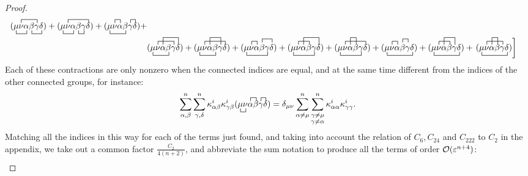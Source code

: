 \documentclass[letterpaper, reqno, 11pt]{amsart}
\theoremstyle{definition}
\theoremstyle{remark}
\numberwithin{equation}{section}
\begin{document}
\begin{proof}
\begin{align*}
\bcontraction{(}{\mu}{\nu}{\al}\contraction{(\mu}{\nu}{\al\bet}{\ga}\bcontraction{(\mu\nu\al}{\bet}{\ga}{\del}(\mu\nu\al\bet\ga\del) +
\bcontraction{(}{\mu}{\nu}{\al}\contraction{(\mu}{\nu}{\al\bet\ga}{\del}\bcontraction{(\mu\nu\al}{\bet}{}{\ga}(\mu\nu\al\bet\ga\del) +
\bcontraction{(}{\mu}{\nu\al}{\bet}\contraction{(\mu}{\nu}{}{\al}\contraction{(\mu\nu\al\bet}{\ga}{}{\del}(\mu\nu\al\bet\ga\del) + \\
& 
\bcontraction{(}{\mu}{\nu\al}{\bet}\contraction{(\mu}{\nu}{\al\bet}{\ga}\contraction[2ex]{(\mu\nu}{\al}{\bet\ga}{\del}(\mu\nu\al\bet\ga\del) +
\bcontraction{(}{\mu}{\nu\al}{\bet}\contraction{(\mu}{\nu}{\al\bet\ga}{\del}\contraction[2ex]{(\mu\nu}{\al}{\bet}{\ga}(\mu\nu\al\bet\ga\del) +
\bcontraction{(}{\mu}{\nu\al\bet}{\ga}\contraction{(\mu}{\nu}{}{\al}\contraction{(\mu\nu\al}{\bet}{\ga}{\del}(\mu\nu\al\bet\ga\del) +
\bcontraction{(}{\mu}{\nu\al\bet}{\ga}\contraction{(\mu}{\nu}{\al}{\bet}\contraction[2ex]{(\mu\nu}{\al}{\bet\ga}{\del}(\mu\nu\al\bet\ga\del) +
\bcontraction{(}{\mu}{\nu\al\bet}{\ga}\contraction{(\mu}{\nu}{\al\bet\ga}{\del}\contraction[2ex]{(\mu\nu}{\al}{}{\bet}(\mu\nu\al\bet\ga\del) +
\bcontraction{(}{\mu}{\nu\al\bet\ga}{\del}\contraction{(\mu}{\nu}{}{\al}\contraction{(\mu\nu\al}{\bet}{}{\ga}(\mu\nu\al\bet\ga\del) +
\bcontraction{(}{\mu}{\nu\al\bet\ga}{\del}\contraction{(\mu}{\nu}{\al}{\bet}\contraction[2ex]{(\mu\nu}{\al}{\bet}{\ga}(\mu\nu\al\bet\ga\del) +
\left.
\bcontraction{(}{\mu}{\nu\al\bet\ga}{\del}\contraction{(\mu}{\nu}{\al\bet}{\ga}\contraction[2ex]{(\mu\nu}{\al}{}{\bet}(\mu\nu\al\bet\ga\del) \right]
\end{align*}
Each of these contractions are only nonzero when the connected indices are equal, and at the same time different from the indices of the other connected groups, for instance:
$$
\sum_{\al,\bet}^n\sum_{\ga,\del}^n\ka^i_{\al\bet}\ka^i_{\ga\bet}\bcontraction{(}{\mu}{}{\nu}\contraction{(\mu\nu}{\al}{}{\bet}\contraction{(\mu\nu\al\bet}{\ga}{}{\del}(\mu\nu\al\bet\ga\del) = 
\del_{\mu\nu}\sum^n_{\al\neq\mu}\sum^n_{\substack{\ga\neq\mu \\ \ga\neq\al}} \ka^i_{\al\al}\ka^i_{\ga\ga}.
$$
Matching all the indices in this way for each of the terms just found, and taking into account the relation of $C_6,C_{24}$ and $C_{222}$ to $C_2$ in the appendix, we take out a common factor $\frac{C_2}{4(n+2)}$, and abbreviate the sum notation to produce all the terms of order ${\mathcal O}(\varepsilon^{n+4})$:
\begin{align*}

\end{align*}
\end{proof}
\end{document}
